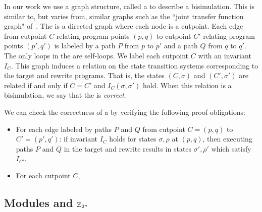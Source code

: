 In our work we use a graph structure, called a \emph{\bisimrep}
to describe a bisimulation. This is similar to, but varies from,
similar graphs such as the ``joint transfer function graph"
of~\cite{Dahiya17ASPLAS}. The \bisimrep{} is a directed graph where
each node is a cutpoint. Each edge from cutpoint $C$ relating program
points $(p,q)$ to cutpoint $C'$ relating program points $(p',q')$ is
labeled by a path $P$ from $p$ to $p'$ and a path $Q$ from $q$ to
$q'$. The only loops in the \bisimrep{} are self-loops. We label each
cutpoint $C$ with an invariant $I_C$. This graph induces a relation on
the state transition systems corresponding to the target and rewrite
programs. That is, the states $(C, \sigma)$ and $(C', \sigma')$ are
related if and only if $C = C'$ and $I_C(\sigma,\sigma')$ hold. When
this relation is a bisimulation, we say that the \bisimrep{} is
\emph{correct}.

We can check the correctness of a \bisimrep{} by
verifying the following proof obligations:

\begin{itemize}
\item For each edge labeled by paths $P$ and $Q$ from cutpoint $C =
(p,q)$ to $C' = (p',q')$: if invariant $I_C$ holds for states $\sigma,
\rho$ at $(p,q)$, then executing paths $P$ and $Q$ in the target and rewrite
results in states $\sigma',\rho'$ which satisfy $I_{C'}$.
\item For each cutpoint $C$, 
\end{itemize}


\subsection{Modules and $\mathbb{Z}_{2^{n}}$}

